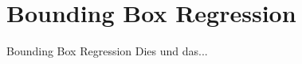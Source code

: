 \section{Bounding Box Regression}

\begin{frame}{Bounding Box Regression}
    Dies und das...
\end{frame}
